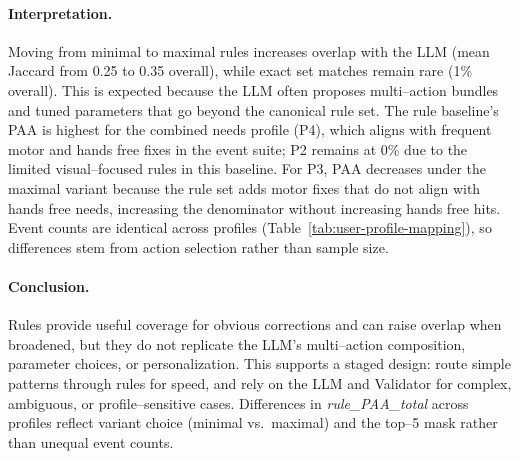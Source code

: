 \begin{table}[H]
\centering
\small %
\setlength{\tabcolsep}{3pt} %
\caption{Rule baseline vs.\ LLM by profile. Jaccard is set overlap of action names.}
\label{tab:rule-vs-llm-compact}
\end{table}

\paragraph{Interpretation.}
Moving from minimal to maximal rules increases overlap with the LLM (mean Jaccard from 0.25 to 0.35 overall), while exact set matches remain rare (1\% overall). This is expected because the LLM often proposes multi–action bundles and tuned parameters that go beyond the canonical rule set. The rule baseline’s PAA is highest for the combined needs profile (P4), which aligns with frequent motor and hands free fixes in the event suite; P2 remains at 0\% due to the limited visual–focused rules in this baseline. For P3, PAA decreases under the maximal variant because the rule set adds motor fixes that do not align with hands free needs, increasing the denominator without increasing hands free hits. Event counts are identical across profiles (Table~\ref{tab:user-profile-mapping}), so differences stem from action selection rather than sample size.

\paragraph{Conclusion.}
Rules provide useful coverage for obvious corrections and can raise overlap when broadened, but they do not replicate the LLM’s multi–action composition, parameter choices, or personalization. This supports a staged design: route simple patterns through rules for speed, and rely on the LLM and Validator for complex, ambiguous, or profile–sensitive cases. Differences in \emph{rule\_PAA\_total} across profiles reflect variant choice (minimal vs.\ maximal) and the top–5 mask rather than unequal event counts. 

